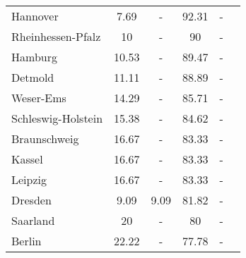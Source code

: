 \begin{table}[H]
\begin{tabularx}{\textwidth}{Xccccc}
            Hannover & 7.69 & - & 92.31 & - \\
            Rheinhessen-Pfalz & 10 & - & 90 & - \\
            Hamburg & 10.53 & - & 89.47 & - \\
            Detmold & 11.11 & - & 88.89 & - \\
            Weser-Ems & 14.29 & - & 85.71 & - \\
            Schleswig-Holstein & 15.38 & - & 84.62 & - \\
            Braunschweig & 16.67 & - & 83.33 & - \\
            Kassel & 16.67 & - & 83.33 & - \\
            Leipzig & 16.67 & - & 83.33 & - \\
            Dresden & 9.09 & 9.09 & 81.82 & - \\
            Saarland & 20 & - & 80 & - \\
            Berlin & 22.22 & - & 77.78 & - \\
        \bottomrule
    \end{tabularx}
\end{table}
    